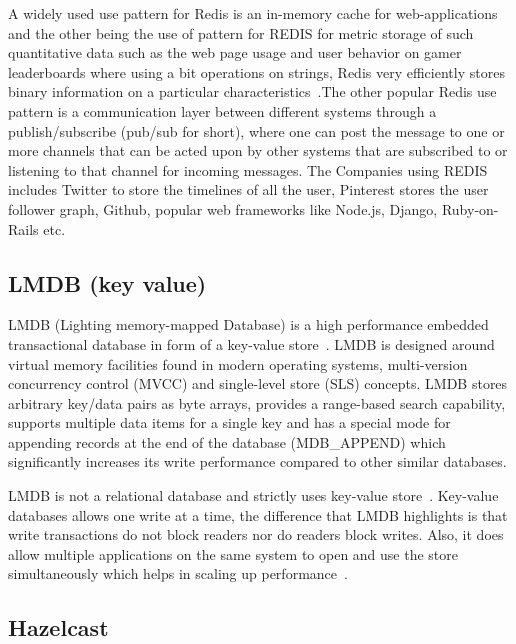 A widely used use pattern for Redis is an in-memory cache for
web-applications and the other being the use of pattern for REDIS for
metric storage of such quantitative data such as the web page usage
and user behavior on gamer leaderboards where using a bit operations
on strings, Redis very efficiently stores binary information on a
particular characteristics~\cite{redis-book-2016}.The other popular
Redis use pattern is a communication layer between different systems
through a publish/subscribe (pub/sub for short), where one can post
the message to one or more channels that can be acted upon by other
systems that are subscribed to or listening to that channel for
incoming messages. The Companies using REDIS includes Twitter to store
the timelines of all the user, Pinterest stores the user follower
graph, Github, popular web frameworks like Node.js, Django,
Ruby-on-Rails etc.

     \pv

\subsection{LMDB (key value)}

LMDB (Lighting memory-mapped Database) is a high performance embedded
transactional database in form of a key-value
store~\cite{www-keyvalue}. LMDB is designed around virtual memory
facilities found in modern operating systems, multi-version
concurrency control (MVCC) and single-level store (SLS) concepts. LMDB
stores arbitrary key/data pairs as byte arrays, provides a range-based
search capability, supports multiple data items for a single key and
has a special mode for appending records at the end of the database
(MDB\_APPEND) which significantly increases its write performance
compared to other similar databases.

LMDB is not a relational database and strictly uses key-value
store~\cite{www-relationaldb}.  Key-value databases allows one write
at a time, the difference that LMDB highlights is that write
transactions do not block readers nor do readers block writes. Also,
it does allow multiple applications on the same system to open and use
the store simultaneously which helps in scaling up
performance~\cite{www-lmdb}.

     \pv

\subsection{Hazelcast}

